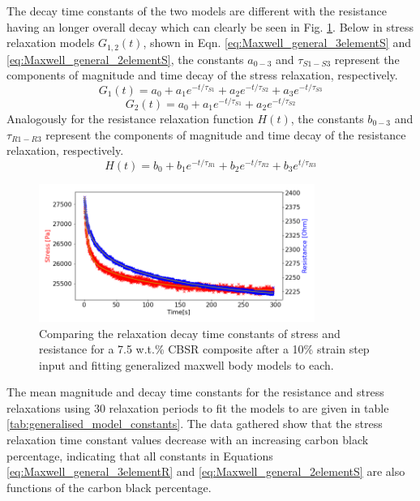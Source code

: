 The decay time constants of the two models are different with the resistance having an longer overall decay which can clearly be seen in Fig. \ref{fig:diff_tau_res_stress}. Below in stress relaxation models $G_{1,2}(t)$, shown in Eqn. \ref{eq:Maxwell_general_3elementS} and \ref{eq:Maxwell_general_2elementS}, the constants $a_{0-3}$ and $\tau_{S1-S3}$ represent the components of magnitude and time decay of the stress relaxation, respectively.
\begin{equation}
	G_1(t) = a_0 + a_1e^{-t/\tau_{S1}} + a_2e^{-t/\tau_{S2}} + a_3e^{-t/\tau_{S3}}
	\label{eq:Maxwell_general_3elementS} 
\end{equation}
\begin{equation}
	G_2(t) = a_0 + a_1e^{-t/\tau_{S1}} + a_2e^{-t/\tau_{S2}}
	\label{eq:Maxwell_general_2elementS} 
\end{equation}
Analogously for the resistance relaxation function $H(t)$, the constants $b_{0-3}$ and $\tau_{R1-R3}$ represent the components of magnitude and time decay of the resistance relaxation, respectively. 
\begin{equation}
	H(t) = b_0 + b_1e^{-t/\tau_{R1}} + b_2e^{-t/\tau_{R2}} + b_3e^{t/\tau_{R3}}
	\label{eq:Maxwell_general_3elementR} 
\end{equation}
\begin{figure}[H]
	\centering
	\includegraphics[width=9cm]{Figures/diff_time_const_Res_Stress_2_7-5_Epin_20mm_v3_pulse_6.png}
	\caption{Comparing the relaxation decay time constants of stress and resistance for a 7.5 w.t.\% CBSR composite after a 10\% strain step input and fitting generalized maxwell body models to each.}
	\label{fig:diff_tau_res_stress}
\end{figure}
The mean magnitude and decay time constants for the resistance and stress relaxations using 30 relaxation periods to fit the models to are given in table \ref{tab:generalised_model_constants}. The data gathered show that the stress relaxation time constant values decrease with an increasing carbon black percentage, indicating that all constants in Equations \ref{eq:Maxwell_general_3elementR} and \ref{eq:Maxwell_general_2elementS} are also functions of the carbon black percentage.

